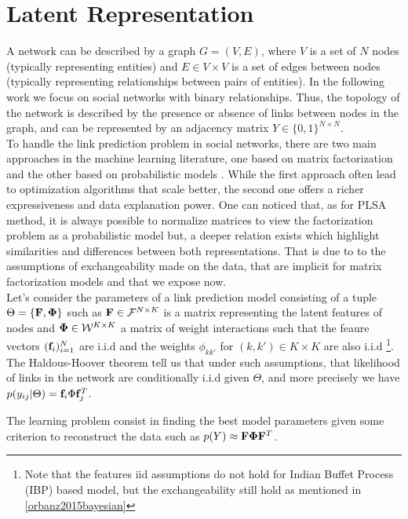 \section{Latent Representation}
\label{sec:background}
A network can be described by a graph $G = (V,E)$, where $V$ is a set of $N$ nodes (typically representing entities) and $E \in V \times V$ is a set of edges between nodes (typically representing relationships between pairs of entities). In the following work we focus on social networks with binary relationships. Thus, the topology of the network is described by the presence or absence of links between nodes in the graph, and can be represented by an adjacency matrix $Y \in \{0,1\}^{N\times N}$.\\

To handle the link prediction problem in social networks, there are two main approaches in the machine learning literature, one based on matrix factorization \cite{menon2011link} and the other based on probabilistic models \cite{goldenberg2010survey}. While the first approach often lead to optimization algorithms that scale better, the second one offers a richer expressiveness and data explanation power.  One can noticed that, as for PLSA method, it is always possible to normalize matrices to view the factorization problem as a probabilistic model but, a deeper relation exists which highlight similarities and differences between both representations. That is due to to the assumptions of exchangeability made on the data, that are implicit for matrix factorization models and that we expose now.\\

Let's consider the parameters of a link prediction model consisting of a tuple $\Theta = \{ \mathbf{F} , \mathbf{\Phi}\}$ such as $\mathbf{F} \in \mathcal{F}^{N\times K}$ is a matrix representing the latent features of nodes and $\mathbf{\Phi} \in \mathcal{W}^{K\times K}$ a matrix of weight interactions such that the feaure vectors $(\mathbf{f}_i)_{i=1}^N$ are i.i.d and the weights $\phi_{kk'}$ for $(k,k') \in K\times K$ are also i.i.d \footnote{Note that the features iid assumptions do not hold for Indian Buffet Process (IBP) based model, but the exchangeability still hold as mentioned in \ref{orbanz2015bayesian}}. The Haldous-Hoover theorem \cite{orbanz2015bayesian} tell us that under such assumptions, that likelihood of links in the network are conditionally i.i.d given $\Theta$, and more precisely we have $p(y_{ij}|\Theta) = \mathbf{f}_i \Phi \mathbf{f}_j^T$.

The learning problem consist in finding the best model parameters given some criterion to reconstruct the data such as $p(Y) \approx \mathbf{F}\mathbf{\Phi}\mathbf{F}^T$. 

